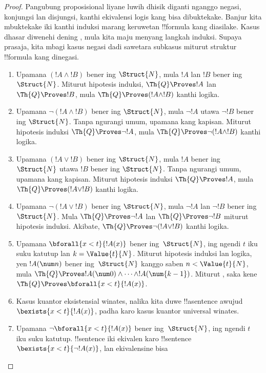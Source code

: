\documentclass[../../../include/open-logic-section]{subfiles}
\begin{document}
\begin{proof}
Pangubung proposisional liyane luwih dhisik diganti nganggo negasi, konjungsi lan disjungsi, kanthi ekivalensi logis kang bisa dibuktekake. Banjur kita mbuktekake iki kanthi induksi marang keruwetan !!{formula} kang diasilake.
%
Kasus dhasar diwenehi dening ,
mula kita maju menyang langkah induksi. Supaya prasaja, kita
mbagi kasus negasi dadi sawetara subkasus miturut struktur
!!{formula} kang dinegasi.

\begin{enumerate}
\item Upamana $(!A \land !B)$ bener ing $\Struct{N}$,
mula $!A$ lan $!B$ bener ing~$\Struct{N}$.
Miturut hipotesis induksi, $\Th{Q} \Proves !A$ lan
$\Th{Q} \Proves !B$,
mula $\Th{Q} \Proves (!A \land !B)$ kanthi logika.
%
\item Upamana $\lnot (!A \land !B)$ bener ing $\Struct{N}$,
mula $\lnot !A$ utawa $\lnot !B$ bener ing $\Struct{N}$.
Tanpa ngurangi umum, upamana kang kapisan. Miturut
hipotesis induksi $\Th{Q} \Proves \lnot !A$, mula
$\Th{Q} \Proves \lnot (!A \land !B)$ kanthi logika.
%
\item Upamana $(!A \lor !B)$ bener ing $\Struct{N}$, mula
$!A$ bener ing $\Struct{N}$ utawa $!B$ bener ing
$\Struct{N}$. Tanpa ngurangi umum, upamana kang kapisan.
Miturut hipotesis induksi $\Th{Q} \Proves !A$, mula
$\Th{Q} \Proves (!A \lor !B)$ kanthi logika.
%
\item Upamana $\lnot(!A \lor !B)$ bener ing $\Struct{N}$,
mula $\lnot !A$ lan $\lnot !B$ bener ing $\Struct{N}$.
Mula $\Th{Q} \Proves \lnot !A$ lan
$\Th{Q} \Proves \lnot !B$ miturut hipotesis induksi.
Akibate, $\Th{Q} \Proves \lnot(!A \lor !B)$ kanthi logika.
%
\item Upamana $\bforall{x<t}{!A(x)}$ bener
ing~$\Struct{N}$, ing ngendi $t$ iku suku katutup lan
$k=\Value{t}{N}$. Miturut hipotesis induksi lan logika, yen
$!A(\num n)$ bener ing~$\Struct{N}$ kanggo saben
$n < \Value{t}{N}$, mula $\Th{Q} \Proves
!A(\num 0) \land \dots \land !A(\num{k-1})$.
Miturut , saka kene
$\Th{Q} \Proves \bforall{x<t}{!A(x)}$.
%
\item Kasus kuantor eksistensial winates, nalika
kita duwe !!a{sentence} awujud $\bexists{x < t}{!A(x)}$,
padha karo kasus kuantor universal winates.
%
\item Upamana $\lnot \bforall{x<t}{!A(x)}$ bener
ing~$\Struct{N}$, ing ngendi $t$ iku suku katutup.
!!{sentence} iki ekivalen karo !!{sentence}
$\bexists{x<t}{\lnot !A(x)}$, lan ekivalensine bisa

\end{enumerate}
\end{proof}
\end{document}
